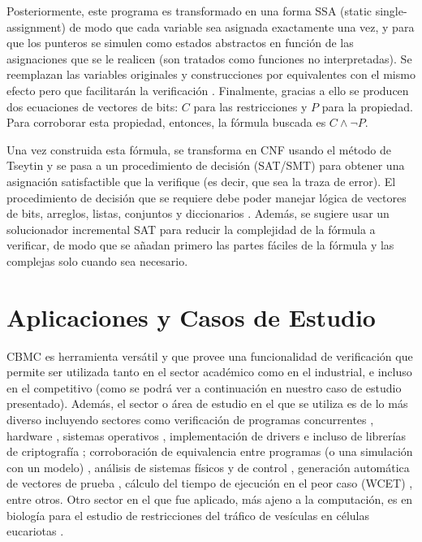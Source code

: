 \documentclass[runningheads]{llncs}
\begin{document}
Posteriormente, este programa es transformado en una forma SSA (static single-assignment) de modo que cada variable sea asignada exactamente una vez, y para que 
los punteros se simulen como estados abstractos en función de las asignaciones que se le realicen (son tratados como funciones no interpretadas).
Se reemplazan las variables originales y construcciones por equivalentes con el mismo efecto pero que facilitarán la verificación \cite{cbmc-slides}.
Finalmente, gracias a ello se producen dos ecuaciones de vectores de bits: $C$ para las restricciones y $P$ para la propiedad.
Para corroborar esta propiedad, entonces, la fórmula buscada es $C \land \neg P$.

Una vez construida esta fórmula, se transforma en CNF usando el método de Tseytin y se pasa a un procedimiento de decisión (SAT/SMT) para obtener una asignación 
satisfactible que la verifique (es decir, que sea la traza de error).
El procedimiento de decisión que se requiere debe poder manejar lógica de vectores de bits, arreglos, listas, conjuntos y diccionarios \cite{cbmc-slides}.
Además, se sugiere usar un solucionador incremental SAT para reducir la complejidad de la fórmula a verificar, de modo que se añadan primero las partes fáciles 
de la fórmula y las complejas solo cuando sea necesario.

%
\section{Aplicaciones y Casos de Estudio}
CBMC es herramienta versátil y que provee una funcionalidad de verificación que permite ser utilizada tanto en el sector académico como en el industrial, e incluso
en el competitivo (como se podrá ver a continuación en nuestro caso de estudio presentado).
Además, el sector o área de estudio en el que se utiliza es de lo más diverso incluyendo sectores como verificación de programas concurrentes \cite{cbmc-concurrent}, 
hardware \cite{cbmc-hardware-case}, sistemas operativos \cite{cbmc-tinyos-case}, implementación de drivers \cite{cbmc-drivers-case} e incluso de
librerías de criptografía \cite{cbmc-ecc-case,cbmc-prng-case}; corroboración de equivalencia entre programas (o una simulación con un modelo) 
\cite{cbmc-equiv-code-generators-case,cbmc-equiv-stateflow-case}, análisis de sistemas físicos y de control \cite{cbmc-vehicles-case}, generación automática de vectores 
de prueba \cite{cbmc-testing-case1,cbmc-testing-case2}, cálculo del tiempo de ejecución en el peor caso (WCET) \cite{cbmc-wcet-case}, entre otros.
Otro sector en el que fue aplicado, más ajeno a la computación, es en biología para el estudio de restricciones del tráfico de vesículas en células eucariotas \cite{cbmc-biology-case}.
\end{document}
